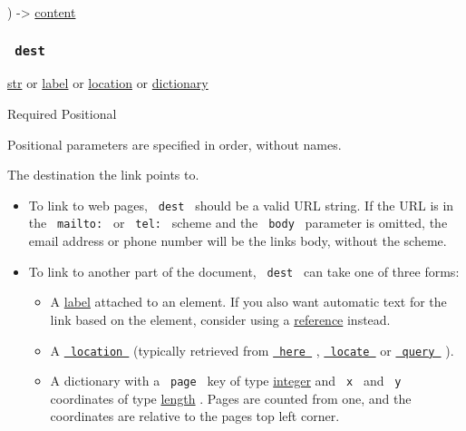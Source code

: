 ) -\textgreater{} \href{/docs/reference/foundations/content/}{content}

\subsubsection{\texorpdfstring{\texttt{\ dest\ }}{ dest }}\label{parameters-dest}

\href{/docs/reference/foundations/str/}{str} {or}
\href{/docs/reference/foundations/label/}{label} {or}
\href{/docs/reference/introspection/location/}{location} {or}
\href{/docs/reference/foundations/dictionary/}{dictionary}

{Required} {{ Positional }}

\label{parameters-dest-positional-tooltip}
Positional parameters are specified in order, without names.

The destination the link points to.

\begin{itemize}
\item
  To link to web pages, \texttt{\ dest\ } should be a valid URL string.
  If the URL is in the \texttt{\ mailto:\ } or \texttt{\ tel:\ } scheme
  and the \texttt{\ body\ } parameter is omitted, the email address or
  phone number will be the link\textquotesingle s body, without the
  scheme.
\item
  To link to another part of the document, \texttt{\ dest\ } can take
  one of three forms:

  \begin{itemize}
  \item
    A \href{/docs/reference/foundations/label/}{label} attached to an
    element. If you also want automatic text for the link based on the
    element, consider using a
    \href{/docs/reference/model/ref/}{reference} instead.
  \item
    A
    \href{/docs/reference/introspection/location/}{\texttt{\ location\ }}
    (typically retrieved from
    \href{/docs/reference/introspection/here/}{\texttt{\ here\ }} ,
    \href{/docs/reference/introspection/locate/}{\texttt{\ locate\ }} or
    \href{/docs/reference/introspection/query/}{\texttt{\ query\ }} ).
  \item
    A dictionary with a \texttt{\ page\ } key of type
    \href{/docs/reference/foundations/int/}{integer} and \texttt{\ x\ }
    and \texttt{\ y\ } coordinates of type
    \href{/docs/reference/layout/length/}{length} . Pages are counted
    from one, and the coordinates are relative to the
    page\textquotesingle s top left corner.
  \end{itemize}
\end{itemize}

